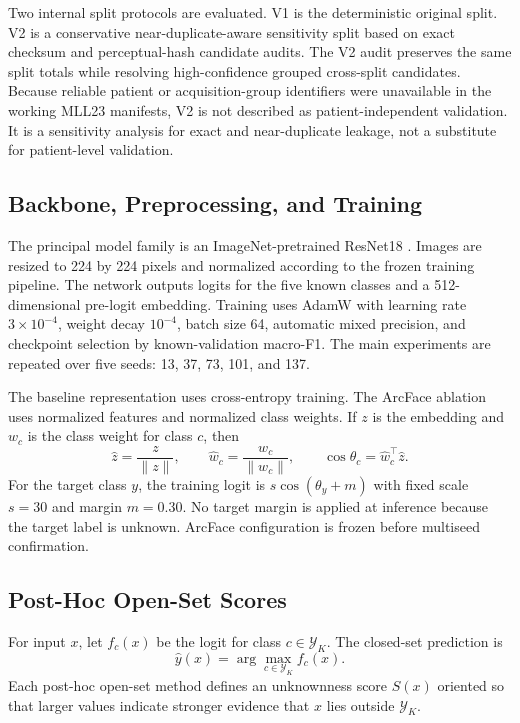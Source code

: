 Two internal split protocols are evaluated. V1 is the deterministic original split. V2 is a conservative near-duplicate-aware sensitivity split based on exact checksum and perceptual-hash candidate audits. The V2 audit preserves the same split totals while resolving high-confidence grouped cross-split candidates. Because reliable patient or acquisition-group identifiers were unavailable in the working MLL23 manifests, V2 is not described as patient-independent validation. It is a sensitivity analysis for exact and near-duplicate leakage, not a substitute for patient-level validation.

\subsection{Backbone, Preprocessing, and Training}

The principal model family is an ImageNet-pretrained ResNet18 \cite{he2016_resnet}. Images are resized to 224 by 224 pixels and normalized according to the frozen training pipeline. The network outputs logits for the five known classes and a 512-dimensional pre-logit embedding. Training uses AdamW with learning rate $3\times10^{-4}$, weight decay $10^{-4}$, batch size 64, automatic mixed precision, and checkpoint selection by known-validation macro-F1. The main experiments are repeated over five seeds: 13, 37, 73, 101, and 137.

The baseline representation uses cross-entropy training. The ArcFace ablation uses normalized features and normalized class weights. If $z$ is the embedding and $w_c$ is the class weight for class $c$, then
\[
\hat{z}=\frac{z}{\lVert z\rVert}, \qquad
\hat{w}_c=\frac{w_c}{\lVert w_c\rVert}, \qquad
\cos\theta_c=\hat{w}_c^\top \hat{z}.
\]
For the target class $y$, the training logit is $s\cos(\theta_y+m)$ with fixed scale $s=30$ and margin $m=0.30$. No target margin is applied at inference because the target label is unknown. ArcFace configuration is frozen before multiseed confirmation.

\subsection{Post-Hoc Open-Set Scores}

For input $x$, let $f_c(x)$ be the logit for class $c\in\mathcal{Y}_K$. The closed-set prediction is
\[
\hat{y}(x)=\arg\max_{c\in\mathcal{Y}_K} f_c(x).
\]
Each post-hoc open-set method defines an unknownness score $S(x)$ oriented so that larger values indicate stronger evidence that $x$ lies outside $\mathcal{Y}_K$.

